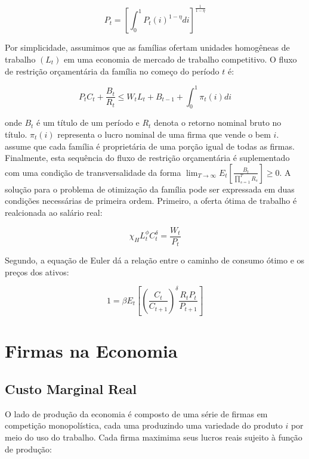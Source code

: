 \documentclass[twoside,a4paper,11pt]{report}
\begin{document}
\begin{equation}\label{eq04en02}
{P}_{t}={[\int _{0}^{1}{{P}_{t}{(i)}^{1-\eta}}di]}^{\frac{1}{1-\eta}}
\end{equation}

Por simplicidade, assumimos que as famílias ofertam unidades homogêneas de trabalho $(L_{t})$ em uma economia de mercado de trabalho competitivo. O fluxo de restrição orçamentária da família no começo do período $t$ é:

\begin{equation}\label{eq05en02}
{P}_{t}{C}_{t}+\frac{{B}_{t}}{{R}_{t}}\le{W}_{t}{L}_{t}+{B}_{t-1}+\int _{0}^{1}{{\pi}_{t}(i)di} 
\end{equation}

\noindent onde ${B}_{t}$ é um título de um período e $R_{t}$ denota o retorno nominal bruto no título. ${\pi}_{t}(i)$ representa o lucro nominal de uma firma que vende o bem $i$. \citet{yao2010aggregate} assume que cada família é proprietária de uma porção igual de todas as firmas. Finalmente, esta sequência do fluxo de restrição orçamentária é suplementado com uma condição de transversalidade da forma $\lim _{T\rightarrow \infty}{{E}_{t}[\frac{{B}_{t}}{\prod _{s=1}^{T}{R_{s}}}]} \ge 0$. A solução para o problema de otimização da família pode ser expressada em duas condições necessárias de primeira ordem. Primeiro, a oferta ótima de trabalho é realcionada ao salário real:

\begin{equation}\label{eq06en02}
{\chi}_{H}{L}_{t}^{\phi}{C}_{t}^{\delta}=\frac{{W}_{t}}{{P}_{t}} 
\end{equation}

Segundo, a equação de Euler dá a relação entre o caminho de consumo ótimo e os preços dos ativos:

\begin{equation}\label{eq07en02}
1=\beta {E}_{t}[{(\frac{{C}_{t}}{{C}_{t+1}})}^{\delta}\frac{{R}_{t}{P}_{t}}{{P}_{t+1}}] 
\end{equation}

\section*{Firmas na Economia}

\subsection*{Custo Marginal Real}

O lado de produção da economia é composto de uma série de firmas em competição monopolística, cada uma produzindo uma variedade do produto $i$ por meio do uso do trabalho. Cada firma maximima seus lucros reais sujeito à função de produção:
\end{document}
